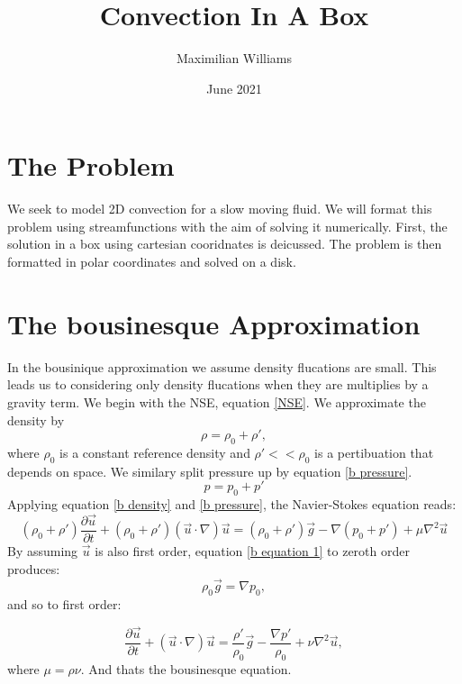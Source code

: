 \documentclass{article}
\title{Convection In A Box}
\author{Maximilian Williams}
\date{June 2021}
\begin{document}
\maketitle

\section*{The Problem}
We seek to model 2D convection for a slow moving fluid. We will format this problem using streamfunctions with the aim of solving it numerically. First, the solution in a box using cartesian cooridnates is deicussed. The problem is then formatted in polar coordinates and solved on a disk.
\section*{The bousinesque Approximation}
In the bousinique approximation we assume density flucations are small. This leads us to considering only density flucations when they are multiplies by a gravity term.
\newline
We begin with the NSE, equation \ref{NSE}. We approximate the density by
\begin{equation}
	\rho = \rho_0 + \rho',
	\label{b density}
\end{equation}
where $\rho_0$ is a constant reference density and $\rho' << \rho_0$ is a pertibuation that depends on space. We similary split pressure up by equation \ref{b pressure}. 
\begin{equation}
	p = p_0 + p'
	\label{b pressure}
\end{equation}
Applying equation \ref{b density} and \ref{b pressure}, the Navier-Stokes equation reads:
\begin{equation}
	(\rho_0 + \rho') \frac{\partial \vec{u}}{\partial t} + (\rho_0 + \rho') (\vec{u} \cdot \nabla) \vec{u} = (\rho_0 + \rho') \vec{g} - \nabla (p_0 + p') + \mu \nabla^2 \vec{u}
	\label{b equation 1}
\end{equation}
By assuming $\vec{u}$ is also first order, equation \ref{b equation 1} to zeroth order produces:
\begin{equation}
	\rho_0 \vec{g} = \nabla p_0,
\end{equation}
and so to first order:

\begin{equation}
	\frac{\partial \vec{u}}{\partial t} + (\vec{u} \cdot \nabla) \vec{u} =  \frac{\rho'}{\rho_0}\vec{g} - \frac{\nabla p'}{\rho_0} + \nu \nabla^2 \vec{u},
	\label{b equation 2}
\end{equation}
where $\mu = \rho \nu$. 
\newline
And thats the bousinesque equation.
\end{document}
